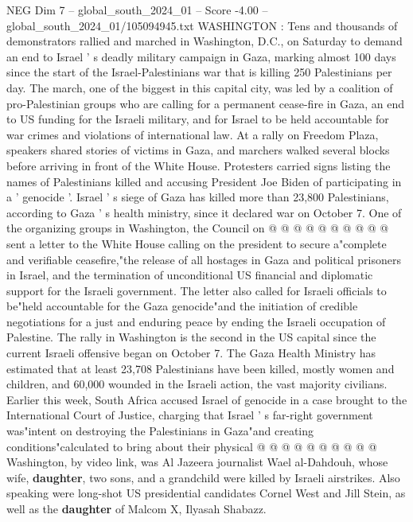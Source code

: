 \begin{textsample}{NEG Dim 7 – global\_south\_2024\_01 – Score -4.00 – global\_south\_2024\_01/105094945.txt}  \label{ex:f7_neg_408}
WASHINGTON : Tens and thousands of demonstrators rallied and marched in Washington, D.C., on Saturday to demand an end to Israel ' s deadly military campaign in Gaza, marking almost 100 days since the start of the Israel-Palestinians war that is killing 250 Palestinians per day.
The march, one of the biggest in this capital city, was led by a coalition of pro-Palestinian groups who are calling for a permanent cease-fire in Gaza, an end to US funding for the Israeli military, and for Israel to be held accountable for war crimes and violations of international law.
At a rally on Freedom Plaza, speakers shared stories of victims in Gaza, and marchers walked several blocks before arriving in front of the White House.
Protesters carried signs listing the names of Palestinians killed and accusing President Joe Biden of participating in a ' genocide '.
Israel ' s siege of Gaza has killed more than 23,800 Palestinians, according to Gaza ' s health ministry, since it declared war on October 7.
One of the organizing groups in Washington, the Council on @ @ @ @ @ @ @ @ @ @ sent a letter to the White House calling on the president to secure a"complete and verifiable ceasefire,"the release of all hostages in Gaza and political prisoners in Israel, and the termination of unconditional US financial and diplomatic support for the Israeli government.
The letter also called for Israeli officials to be"held accountable for the Gaza genocide"and the initiation of credible negotiations for a just and enduring peace by ending the Israeli occupation of Palestine.
The rally in Washington is the second in the US capital since the current Israeli offensive began on October 7.
The Gaza Health Ministry has estimated that at least 23,708 Palestinians have been killed, mostly women and children, and 60,000 wounded in the Israeli action, the vast majority civilians.
Earlier this week, South Africa accused Israel of genocide in a case brought to the International Court of Justice, charging that Israel ' s far-right government was"intent on destroying the Palestinians in Gaza"and creating conditions"calculated to bring about their physical @ @ @ @ @ @ @ @ @ @ Washington, by video link, was Al Jazeera journalist Wael al-Dahdouh, whose wife, \textbf{daughter}, two sons, and a grandchild were killed by Israeli airstrikes.
Also speaking were long-shot US presidential candidates Cornel West and Jill Stein, as well as the \textbf{daughter} of Malcom X, Ilyasah Shabazz.

\end{textsample}
